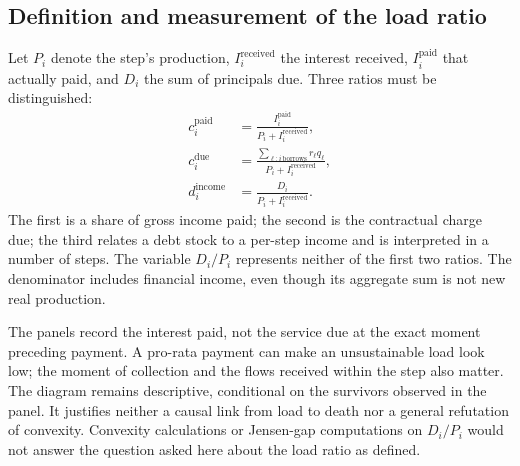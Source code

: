 \subsection{Definition and measurement of the load ratio}\label{sec:charge}
Let $P_i$ denote the step's production, $I_i^{\text{received}}$ the interest
received, $I_i^{\text{paid}}$ that actually paid, and $D_i$ the
sum of principals due. Three ratios must be distinguished:
\begin{align*}
 c_i^{\text{paid}}&=\frac{I_i^{\text{paid}}}{P_i+I_i^{\text{received}}},\\
 c_i^{\text{due}}&=\frac{\sum_{\ell:i\,\mathrm{borrows}}r_\ell q_\ell}{P_i+I_i^{\text{received}}},\\
 d_i^{\text{income}}&=\frac{D_i}{P_i+I_i^{\text{received}}}.
\end{align*}
The first is a share of gross income paid; the second is the
contractual charge due; the third relates a debt stock
to a per-step income and is interpreted in a number of steps. The
variable $D_i/P_i$ represents neither of the first two ratios.
The denominator includes financial income, even though its
aggregate sum is not new real production.


The panels record the interest paid, not the service due
at the exact moment preceding payment. A pro-rata payment can
make an unsustainable load look low; the moment of
collection and the flows received within the step also matter.
The diagram remains descriptive, conditional on the survivors observed
in the panel. It justifies neither a causal link from load to
death nor a general refutation of convexity. Convexity
calculations or Jensen-gap computations on $D_i/P_i$ would not answer
the question asked here about the load ratio as defined.

